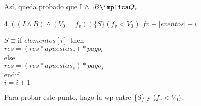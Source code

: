 \documentclass[10pt,a4paper]{article}
\begin{document}
\begin{itemize}[leftmargin=*]
Así, queda probado que I $\wedge \neg B \implica Q_c$
\vspace{0.3cm}\\
    \item[4]$((I \wedge B) \wedge (V_0 = f_{v}))\{S\} (f_v < V_0)$
\vspace{0.3cm}
${fv \equiv |eventos| - i}$

$S \equiv $\phantom{.}if $elementos[i]$ then\\
\tab \tab$res = (res * apuestas_c)*pago_c$\\
\tab else\\
\tab \tab$res = (res * apuestas_s)*pago_s$\\
\tab endif\\
$i = i+1$

Para probar este punto, hago la wp entre \{S\} y ($f_v<V_0)$.


\end{itemize}
\end{document}
